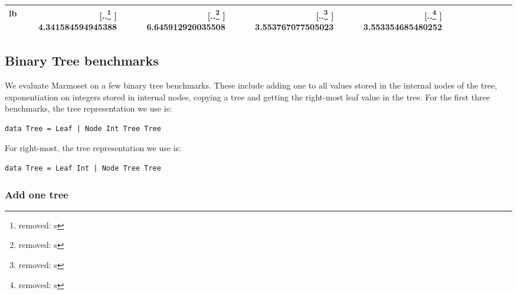 \documentclass[acmsmall,review,anonymous]{acmart}\settopmatter{printfolios=true,printccs=false,printacmref=false}
\newcommand{\system}{{\sc Marmoset}\xspace}
\newcommand{\snum}[1]{{\num[round-precision=3,round-mode=figures,scientific-notation=true,output-exponent-marker = e]{#1}}}
\newcommand{\fnumthree}[1]{ {\num[round-mode=places,round-precision=3, scientific-notation=false]{#1}}}
\providecommand{\DIFdeltex}[1]{{\protect\color{red} [..\footnote{removed: #1} ]}} %
\providecommand{\DIFdelFL}[1]{\DIFdel{#1}} %
\providecommand{\DIFaddbeginFL}{} %
\providecommand{\DIFaddendFL}{} %
\providecommand{\DIFdelbeginFL}{} %
\providecommand{\DIFdelendFL}{} %
\providecommand{\DIFdel}[1]{\texorpdfstring{\DIFdeltex{#1}}{}} %
\newcommand{\DIFscaledelfig}{0.5}
\newlength{\DIFdelgraphicswidth} %
\newlength{\DIFdelgraphicsheight} %
\newcommand{\DIFaddincludegraphics}[2][]{{\color{blue}\fbox{\DIFOincludegraphics[#1]{#2}}}} %
\newcommand{\DIFdelincludegraphics}[2][]{%
\sbox{\DIFdelgraphicsbox}{\DIFOincludegraphics[#1]{#2}}%
\settoboxwidth{\DIFdelgraphicswidth}{\DIFdelgraphicsbox} %
\settoboxtotalheight{\DIFdelgraphicsheight}{\DIFdelgraphicsbox} %
\scalebox{\DIFscaledelfig}{%
\parbox[b]{\DIFdelgraphicswidth}{\usebox{\DIFdelgraphicsbox}\\[-\baselineskip] \rule{\DIFdelgraphicswidth}{0em}}\llap{\resizebox{\DIFdelgraphicswidth}{\DIFdelgraphicsheight}{%
\setlength{\unitlength}{\DIFdelgraphicswidth}%
\begin{picture}(1,1)%
\thicklines\linethickness{2pt} %
{\color[rgb]{1,0,0}\put(0,0){\framebox(1,1){}}}%
{\color[rgb]{1,0,0}\put(0,0){\line( 1,1){1}}}%
{\color[rgb]{1,0,0}\put(0,1){\line(1,-1){1}}}%
\end{picture}%
}\hspace*{3pt}}} %
} %
\DeclareRobustCommand{\DIFaddbeginFL}{\DIFOaddbeginFL \let\includegraphics\DIFaddincludegraphics} %
\DeclareRobustCommand{\DIFaddendFL}{\DIFOaddendFL \let\includegraphics\DIFOincludegraphics} %
\DeclareRobustCommand{\DIFdelbeginFL}{\DIFOdelbeginFL \let\includegraphics\DIFdelincludegraphics} %
\DeclareRobustCommand{\DIFdelendFL}{\DIFOaddendFL \let\includegraphics\DIFOincludegraphics} %
\begin{document}
\begin{table}[]
\begin{tabular}{@{}p{0.6in}rcrcrcrcrcrcrcr@{}}
				   \\
	lb         
	               &    \DIFdelbeginFL %
\DIFdelFL{s
				   }\DIFdelendFL \DIFaddbeginFL \fnumthree{4.341584594945388}
				   \DIFaddendFL &&    \DIFdelbeginFL %
\DIFdelFL{s
				   }\DIFdelendFL \DIFaddbeginFL \fnumthree{6.645912920035508}
				   \DIFaddendFL &&    \DIFdelbeginFL %
\DIFdelFL{s
				   }\DIFdelendFL \DIFaddbeginFL \fnumthree{3.553767077505023}
				   \DIFaddendFL &&    \DIFdelbeginFL %
\DIFdelFL{s
				   }\DIFdelendFL \DIFaddbeginFL \fnumthree{3.553354685480252}
				   \DIFaddendFL \\
	\bottomrule
	\end{tabular}
	\label{table:Logical-Expression-Evaluator}
\end{table}


\subsection{Binary Tree benchmarks}\label{subsec:trees}

We evaluate \system on a few binary tree benchmarks. These include adding one to all values stored in the internal nodes of the tree, exponentiation on integers stored in internal nodes, copying a tree and getting the right-most leaf value in the tree.
For the first three benchmarks, the tree representation we use is:
\begin{lstlisting}[]
data Tree = Leaf | Node Int Tree Tree
\end{lstlisting}
For right-most, the tree representation we use is:
\begin{lstlisting}[]
data Tree = Leaf Int | Node Tree Tree
\end{lstlisting}

\subsubsection{Add one tree}
\end{document}
